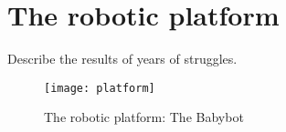 \section{The robotic platform}
Describe the results of years of struggles.

\begin{figure}
\centering
\texttt{[image: platform]}
\caption{The robotic platform: The Babybot}
\label{platform}
\end{figure}
